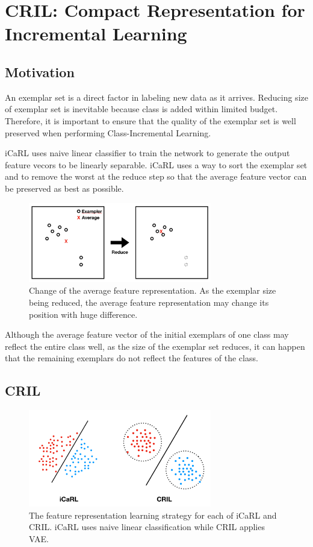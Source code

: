 
\section{CRIL: Compact Representation for Incremental Learning}
\label{sec:cril}

\subsection{Motivation}
\label{sec:motivation}

An exemplar set is a direct factor in labeling new data as it arrives. Reducing size of exemplar set is inevitable because class is added within limited budget. Therefore, it is important to ensure that the quality of the exemplar set is well preserved when performing Class-Incremental Learning.

iCaRL uses naive linear classifier to train the network to generate the output feature vecors to be linearly separable. iCaRL uses a way to sort the exemplar set and to remove the worst at the reduce step so that the average feature vector can be preserved as best as possible.

\begin{figure}[h]
\includegraphics[width=80mm]{data/compact_motivation.png}
\centering
\caption{Change of the average feature representation. As the exemplar size being reduced, the average feature representation may change its position with huge difference. \label{fig:compact_motivation}}
\end{figure}
Although the average feature vector of the initial exemplars of one class may reflect the entire class well, as the size of the exemplar set reduces, it can happen that the remaining exemplars do not reflect the features of the class.

\subsection{CRIL}

\begin{figure}[h]
\includegraphics[width=80mm]{data/compact_representation.png}
\centering
\caption{The feature representation learning strategy for each of iCaRL and CRIL. iCaRL uses naive linear classification while CRIL applies VAE. \label{fig:compact_representation}}
\end{figure}

